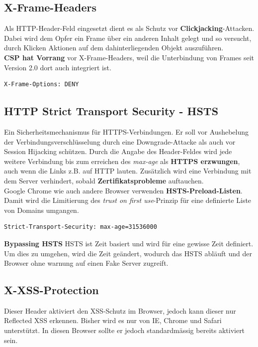 \subsection{X-Frame-Headers}
Als HTTP-Header-Feld eingesetzt dient es als Schutz vor \textbf{Clickjacking}-Attacken. Dabei wird dem Opfer ein Frame über ein anderen Inhalt gelegt und so versucht, durch Klicken Aktionen auf dem dahinterliegenden Objekt auszuführen.\\
\textbf{CSP hat Vorrang} vor X-Frame-Headers, weil die Unterbindung von Frames seit Version 2.0 dort auch integriert ist.

\begin{lstlisting}[caption=Clickjacking mittels X-Frame-Options unterbinden, language={}]
X-Frame-Options: DENY
\end{lstlisting}

\subsection{HTTP Strict Transport Security - HSTS}
Ein Sicherheitsmechanismus für HTTPS-Verbindungen. Er soll vor Aushebelung der Verbindungsverschlüsselung durch eine Downgrade-Attacke als auch vor Session Hijacking schützen. Durch die Angabe des Header-Feldes wird jede weitere Verbindung bis zum erreichen des \textit{max-age} als \textbf{HTTPS erzwungen}, auch wenn die Links z.B. auf HTTP lauten. Zusätzlich wird eine Verbindung mit dem Server verhindert, sobald \textbf{Zertifikatsprobleme} auftauchen.\\

Google Chrome wie auch andere Browser verwenden \textbf{HSTS-Preload-Listen}. Damit wird die Limitierung des \textit{trust on first use}-Prinzip für eine definierte Liste von Domains umgangen.

\begin{lstlisting}[language={},caption=HSTS-Header]
Strict-Transport-Security: max-age=31536000
\end{lstlisting}

\textbf{Bypassing HSTS}
HSTS ist Zeit basiert und wird für eine gewisse Zeit definiert. Um dies zu umgehen, wird die Zeit geändert, wodurch das HSTS abläuft und der Browser ohne warnung auf einen Fake Server zugreift.

\subsection{X-XSS-Protection}
Dieser Header aktiviert den XSS-Schutz im Browser, jedoch kann dieser nur Reflected XSS erkennen. Bisher wird es nur von IE, Chrome und Safari unterstützt. In diesen Browser sollte er jedoch standardmässig bereits aktiviert sein.

